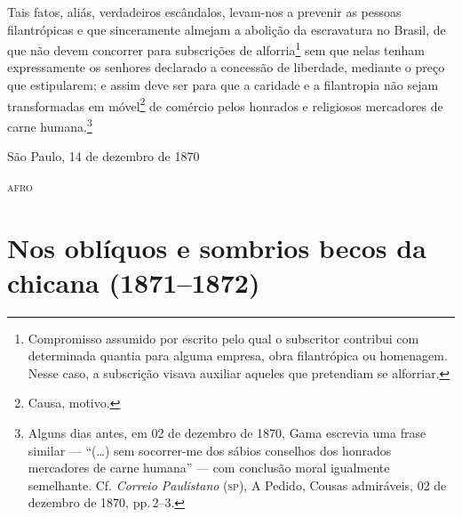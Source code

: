Tais fatos, aliás, verdadeiros escândalos, levam-nos a prevenir as
pessoas filantrópicas e que sinceramente almejam a abolição da
escravatura no Brasil, de que não devem concorrer para subscrições de
alforria\footnote{ Compromisso assumido por escrito pelo qual o
  subscritor contribui com determinada quantia para alguma empresa, obra
  filantrópica ou homenagem. Nesse caso, a subscrição visava auxiliar
  aqueles que pretendiam se alforriar.} sem que nelas tenham
expressamente os senhores declarado a concessão de liberdade, mediante o
preço que estipularem; e assim deve ser para que a caridade e a
filantropia não sejam transformadas em móvel\footnote{ Causa, motivo.}
de comércio pelos honrados e religiosos mercadores de carne
humana.\footnote{ Alguns dias antes, em 02 de dezembro de 1870, Gama escrevia uma
  frase similar --- ``(\ldots{}) sem socorrer-me dos sábios conselhos dos
  honrados mercadores de carne humana'' --- com conclusão moral igualmente
  semelhante. Cf. \emph{Correio Paulistano} (\textsc{sp}), A Pedido, Cousas
  admiráveis, 02 de dezembro de 1870, pp.\,2--3.}

\begin{flushright}
São Paulo, 14 de dezembro de 1870

\textsc{afro}
\end{flushright}

\part{Nos oblíquos e sombrios becos da chicana (1871--1872)}

